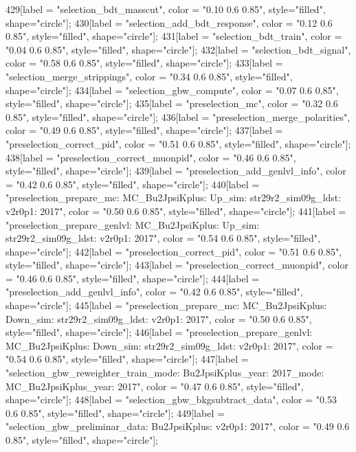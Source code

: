 {	429[label = "selection_bdt_masscut", color = "0.10 0.6 0.85", style="filled", shape="circle"];
	430[label = "selection_add_bdt_response", color = "0.12 0.6 0.85", style="filled", shape="circle"];
	431[label = "selection_bdt_train", color = "0.04 0.6 0.85", style="filled", shape="circle"];
	432[label = "selection_bdt_signal", color = "0.58 0.6 0.85", style="filled", shape="circle"];
	433[label = "selection_merge_strippings", color = "0.34 0.6 0.85", style="filled", shape="circle"];
	434[label = "selection_gbw_compute", color = "0.07 0.6 0.85", style="filled", shape="circle"];
	435[label = "preselection_mc", color = "0.32 0.6 0.85", style="filled", shape="circle"];
	436[label = "preselection_merge_polarities", color = "0.49 0.6 0.85", style="filled", shape="circle"];
	437[label = "preselection_correct_pid", color = "0.51 0.6 0.85", style="filled", shape="circle"];
	438[label = "preselection_correct_muonpid", color = "0.46 0.6 0.85", style="filled", shape="circle"];
	439[label = "preselection_add_genlvl_info", color = "0.42 0.6 0.85", style="filled", shape="circle"];
	440[label = "preselection_prepare_mc\nmode: MC_Bu2JpsiKplus\npolarity: Up\nstrip_sim: str29r2_sim09g_ldst\nversion: v2r0p1\nyear: 2017", color = "0.50 0.6 0.85", style="filled", shape="circle"];
	441[label = "preselection_prepare_genlvl\nmode: MC_Bu2JpsiKplus\npolarity: Up\nstrip_sim: str29r2_sim09g_ldst\nversion: v2r0p1\nyear: 2017", color = "0.54 0.6 0.85", style="filled", shape="circle"];
	442[label = "preselection_correct_pid", color = "0.51 0.6 0.85", style="filled", shape="circle"];
	443[label = "preselection_correct_muonpid", color = "0.46 0.6 0.85", style="filled", shape="circle"];
	444[label = "preselection_add_genlvl_info", color = "0.42 0.6 0.85", style="filled", shape="circle"];
	445[label = "preselection_prepare_mc\nmode: MC_Bu2JpsiKplus\npolarity: Down\nstrip_sim: str29r2_sim09g_ldst\nversion: v2r0p1\nyear: 2017", color = "0.50 0.6 0.85", style="filled", shape="circle"];
	446[label = "preselection_prepare_genlvl\nmode: MC_Bu2JpsiKplus\npolarity: Down\nstrip_sim: str29r2_sim09g_ldst\nversion: v2r0p1\nyear: 2017", color = "0.54 0.6 0.85", style="filled", shape="circle"];
	447[label = "selection_gbw_reweighter_train\ndata_mode: Bu2JpsiKplus\ndata_year: 2017\nmc_mode: MC_Bu2JpsiKplus\nmc_year: 2017", color = "0.47 0.6 0.85", style="filled", shape="circle"];
	448[label = "selection_gbw_bkgsubtract_data", color = "0.53 0.6 0.85", style="filled", shape="circle"];
	449[label = "selection_gbw_preliminar_data\nmode: Bu2JpsiKplus\nversion: v2r0p1\nyear: 2017", color = "0.49 0.6 0.85", style="filled", shape="circle"];
}
